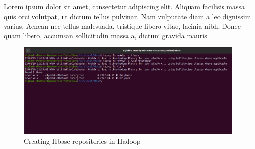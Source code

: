 \begin{spacing}{1.2}
\par Lorem ipsum dolor sit amet, consectetur adipiscing elit. Aliquam facilisis massa quis orci volutpat, ut dictum tellus pulvinar. Nam vulputate diam a leo dignissim varius. Aenean nec tellus malesuada, tristique libero vitae, lacinia nibh. Donec quam libero, accumsan sollicitudin massa a, dictum gravida mauris
\\
\begin{figure}[!htb] 
\begin{center} 
\includegraphics[width=1\linewidth]{Pictures/HBase/Configuring Hbase in Standalone & Pseudo-distributed mode/Configuring Hbase in Standalone mode/Creating Hbase repositories in Hadoop} 
\end{center} 
\caption{Creating Hbase repositories in Hadoop} 
\end{figure}  \FloatBarrier
\\

\end{spacing}
